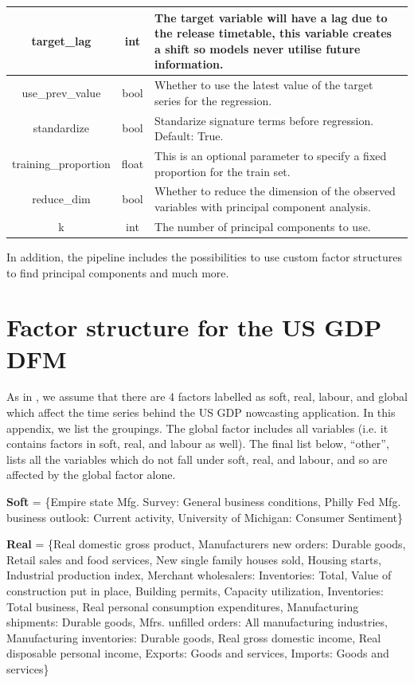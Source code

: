 \documentclass[a4paper, 12pt]{article}
\theoremstyle{remark}
\begin{document}
\begin{table}[]
\begin{tabular}{c c m{18em}}
        \hline
        target\_lag & int & The target variable will have a lag due to the release timetable, this variable creates a shift so models never utilise future information.\\
        \hline
        use\_prev\_value & bool & Whether to use the latest value of the target series for the regression. \\
        \hline
        standardize & bool & Standarize signature terms before regression. Default: True. \\
        \hline
        training\_proportion & float & This is an optional parameter to specify a fixed proportion for the train set.\\
        \hline
        reduce\_dim & bool & Whether to reduce the dimension of the observed variables with principal component analysis.\\
        \hline
        k & int & The number of principal components to use.\\
        
    \end{tabular}
    \label{tab:config_desc}
\end{table}

In addition, the pipeline includes the possibilities to use custom factor structures to find principal components and much more.
\section{Factor structure for the US GDP DFM}\label{sec:usgdp_factors}

As in \citet{bok2018macroeconomic}, we assume that there are 4 factors labelled as soft, real, labour, and global which affect the time series behind the US GDP nowcasting application. In this appendix, we list the groupings. The global factor includes all variables (i.e. it contains factors in soft, real, and labour as well). The final list below, ``other'', lists all the variables which do not fall under soft, real, and labour, and so are affected by the global factor alone.

\vspace{1em}

\noindent \textbf{Soft} = \{Empire state Mfg. Survey: General business conditions, Philly Fed Mfg. business outlook: Current activity, University of Michigan: Consumer Sentiment\}

\vspace{1em}

\noindent \textbf{Real} = \{Real domestic gross product, Manufacturers new orders: Durable goods, Retail sales and food services, New single family houses sold, Housing starts, Industrial production index, Merchant wholesalers: Inventories: Total, Value of construction put in place, Building permits, Capacity utilization, Inventories: Total business, Real personal consumption expenditures, Manufacturing shipments: Durable goods, Mfrs. unfilled orders: All manufacturing industries, Manufacturing inventories: Durable goods, Real gross domestic income, Real disposable personal income, Exports: Goods and services, Imports: Goods and services\}
\end{document}
